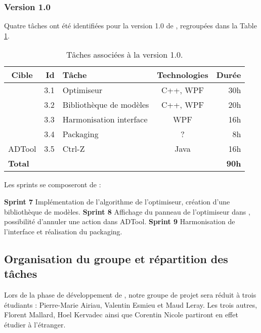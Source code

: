 	\subsubsection{Version 1.0}
		Quatre tâches ont été identifiées pour la version 1.0 de \glasir{}, regroupées dans la {\sc Table} \ref{tab:taches_units_3}.
		\begin{table}[h]
			\centering
			\begin{tabular}{|c|r|l|c|r|}
				\hline
				\textbf{Cible} & \textbf{Id} & \textbf{Tâche} & \textbf{Technologies} & \textbf{Durée}\\
				\hline

				\multirow{4}{*}{\glasir{}} & 3.1 & Optimiseur & C++, WPF & 30h\\
				\cline{2-5}
				 & 3.2 & Bibliothèque de modèles & C++, WPF & 20h\\
				\cline{2-5}
				 & 3.3 & Harmonisation interface & WPF & 16h\\
				\cline{2-5}
				 & 3.4 & Packaging & ? & 8h\\
				\hline

				\multirow{1}{*}{ADTool} & 3.5 & Ctrl-Z & \multirow{1}{*}{Java} & 16h\\
				\hline

				\multicolumn{4}{|l|}{\bf Total} & {\bf 90h}\\
				\hline
			\end{tabular}
			\caption{Tâches associées à la version 1.0.}
			\label{tab:taches_units_3}
		\end{table}
		
		Les sprints se composeront de :		
		
		\textbf{Sprint 7} Implémentation de l'algorithme de l'optimiseur, création d'une bibliothèque de modèles.\newline
		\textbf{Sprint 8} Affichage du panneau de l'optimiseur dans \glasir{}, possibilité d'annuler une action dans ADTool.\newline
		\textbf{Sprint 9} Harmonisation de l'interface et réalisation du packaging. \newline

	
	\subsection{Organisation du groupe et répartition des tâches}
		Lors de la phase de développement de \glasir{}, notre groupe de projet sera réduit à trois étudiants : Pierre-Marie {\sc Airiau}, Valentin {\sc Esmieu} et Maud {\sc Leray}. Les trois autres, Florent {\sc Mallard}, Hoel {\sc Kervadec} ainsi que Corentin {\sc Nicole} partiront en effet étudier à l'étranger.
		
